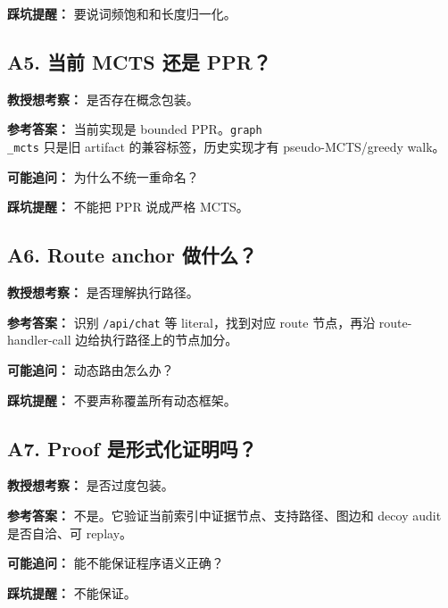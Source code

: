 \documentclass[UTF8,12pt,openany]{ctexbook}
\begin{document}
\textbf{踩坑提醒：} 要说词频饱和和长度归一化。\par

\subsection{A5. 当前 MCTS 还是 PPR？}

\textbf{教授想考察：} 是否存在概念包装。\par

\textbf{参考答案：} 当前实现是 bounded PPR。\texttt{graph\\_mcts} 只是旧 artifact 的兼容标签，历史实现才有 pseudo-MCTS/greedy walk。\par

\textbf{可能追问：} 为什么不统一重命名？\par

\textbf{踩坑提醒：} 不能把 PPR 说成严格 MCTS。\par

\subsection{A6. Route anchor 做什么？}

\textbf{教授想考察：} 是否理解执行路径。\par

\textbf{参考答案：} 识别 \texttt{/api/chat} 等 literal，找到对应 route 节点，再沿 route-handler-call 边给执行路径上的节点加分。\par

\textbf{可能追问：} 动态路由怎么办？\par

\textbf{踩坑提醒：} 不要声称覆盖所有动态框架。\par

\subsection{A7. Proof 是形式化证明吗？}

\textbf{教授想考察：} 是否过度包装。\par

\textbf{参考答案：} 不是。它验证当前索引中证据节点、支持路径、图边和 decoy audit 是否自洽、可 replay。\par

\textbf{可能追问：} 能不能保证程序语义正确？\par

\textbf{踩坑提醒：} 不能保证。\par
\end{document}
